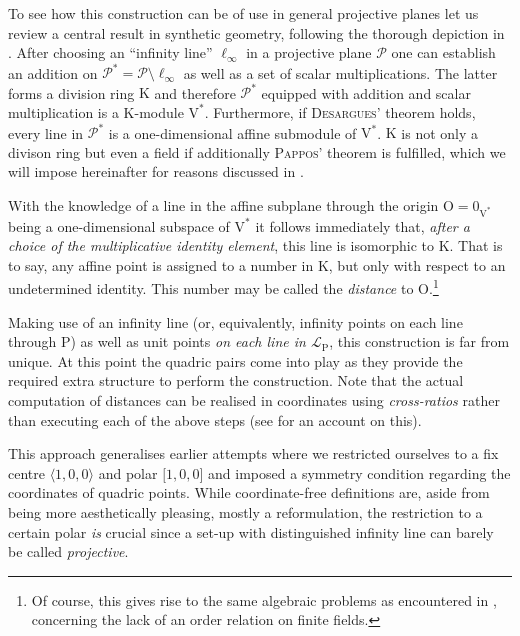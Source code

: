 \documentclass[12pt,english,paper=a4,DIV=12,headings=small,numbers=noenddot,parskip=half]{scrartcl}
\theoremstyle{definition}
\begin{document}
To see how this construction can be of use in general projective planes let us review a central result in synthetic geometry, following the thorough depiction in \cite{Beutelspacher:2004}. After choosing an ``infinity line'' $\ell_\infty$ in a projective plane $\mathscr{P}$ one can establish an addition on $\mathscr{P}^*=\mathscr{P}\setminus\ell_\infty$ as well as a set of scalar multiplications. The latter forms a division ring $\mathrm{K}$ and therefore $\mathscr{P}^*$ equipped with addition and scalar multiplication is a $\mathrm{K}$-module $\mathrm{V}^*$. Furthermore, if \textsc{Desargues}' theorem holds, every line in $\mathscr{P}^*$ is a one-dimensional affine submodule of $\mathrm{V}^*$. $\mathrm{K}$ is not only a divison ring but even a field if additionally \textsc{Pappos}' theorem is fulfilled, which we will impose hereinafter for reasons discussed in \cite{Alex:Th12}.

With the knowledge of a line in the affine subplane through the origin $\mathrm{O}=0_{\mathrm{V}^*}$ being a one-dimensional subspace of $\mathrm{V}^*$ it follows immediately that, \emph{after a choice of the multiplicative identity element}, this line is isomorphic to $\mathrm{K}$. That is to say, any affine point is assigned to a number in $\mathrm{K}$, but only with respect to an undetermined identity. This number may be called the \emph{distance} to $\mathrm{O}$.\footnote{Of course, this gives rise to the same algebraic problems as encountered in \cite{AlKr:2013}, concerning the lack of an order relation on finite fields.}

Making use of an infinity line (or, equivalently, infinity points on each line through $\mathrm{P}$) as well as unit points \emph{on each line in $\mathscr{L}_\mathrm{P}$}, this construction is far from unique. At this point the quadric pairs come into play as they provide the required extra structure to perform the construction. Note that the actual computation of distances can be realised in coordinates using \emph{cross-ratios} rather than executing each of the above steps (see \cite{Alex:2013} for an account on this).

This approach generalises earlier attempts where we restricted ourselves to a fix centre $\langle1,0,0\rangle$ and polar $\lbrack1,0,0\rbrack$ and imposed a symmetry condition regarding the coordinates of quadric points. While coordinate-free definitions are, aside from being more aesthetically pleasing, mostly a reformulation, the restriction to a certain polar \emph{is} crucial since a set-up with distinguished infinity line can barely be called \emph{projective}.
\end{document}
